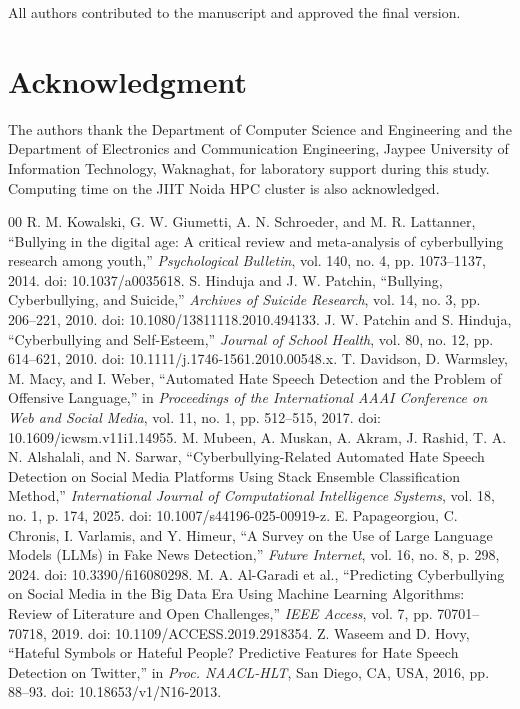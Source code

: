 \documentclass[journal]{IEEEtran}
\begin{document}
All authors contributed to the manuscript and approved the final version.

\section*{Acknowledgment}
The authors thank the Department of Computer Science and Engineering and the Department of Electronics and Communication Engineering, Jaypee University of Information Technology, Waknaghat, for laboratory support during this study. Computing time on the JIIT Noida HPC cluster is also acknowledged.

\begin{thebibliography}{00}
 R. M. Kowalski, G. W. Giumetti, A. N. Schroeder, and M. R. Lattanner, ``Bullying in the digital age: A critical review and meta-analysis of cyberbullying research among youth,'' \textit{Psychological Bulletin}, vol. 140, no. 4, pp. 1073--1137, 2014. doi: 10.1037/a0035618.
 S. Hinduja and J. W. Patchin, ``Bullying, Cyberbullying, and Suicide,'' \textit{Archives of Suicide Research}, vol. 14, no. 3, pp. 206--221, 2010. doi: 10.1080/13811118.2010.494133.
 J. W. Patchin and S. Hinduja, ``Cyberbullying and Self-Esteem,'' \textit{Journal of School Health}, vol. 80, no. 12, pp. 614--621, 2010. doi: 10.1111/j.1746-1561.2010.00548.x.
 T. Davidson, D. Warmsley, M. Macy, and I. Weber, ``Automated Hate Speech Detection and the Problem of Offensive Language,'' in \textit{Proceedings of the International AAAI Conference on Web and Social Media}, vol. 11, no. 1, pp. 512--515, 2017. doi: 10.1609/icwsm.v11i1.14955.
 M. Mubeen, A. Muskan, A. Akram, J. Rashid, T. A. N. Alshalali, and N. Sarwar, ``Cyberbullying-Related Automated Hate Speech Detection on Social Media Platforms Using Stack Ensemble Classification Method,'' \textit{International Journal of Computational Intelligence Systems}, vol. 18, no. 1, p. 174, 2025. doi: 10.1007/s44196-025-00919-z.
 E. Papageorgiou, C. Chronis, I. Varlamis, and Y. Himeur, ``A Survey on the Use of Large Language Models (LLMs) in Fake News Detection,'' \textit{Future Internet}, vol. 16, no. 8, p. 298, 2024. doi: 10.3390/fi16080298.
 M. A. Al-Garadi et al., ``Predicting Cyberbullying on Social Media in the Big Data Era Using Machine Learning Algorithms: Review of Literature and Open Challenges,'' \textit{IEEE Access}, vol. 7, pp. 70701--70718, 2019. doi: 10.1109/ACCESS.2019.2918354.
 Z. Waseem and D. Hovy, ``Hateful Symbols or Hateful People? Predictive Features for Hate Speech Detection on Twitter,'' in \textit{Proc. NAACL-HLT}, San Diego, CA, USA, 2016, pp. 88--93. doi: 10.18653/v1/N16-2013.

\end{thebibliography}
\end{document}

